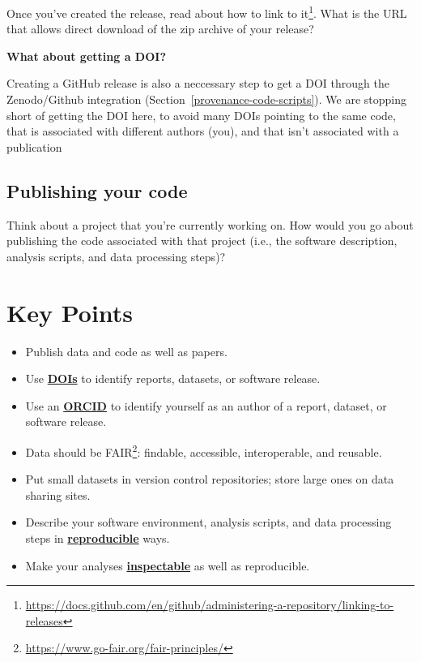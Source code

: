 \documentclass[
]{krantz}
\providecommand{\tightlist}{%
  \setlength{\itemsep}{0pt}\setlength{\parskip}{0pt}}
\renewenvironment{quote}{\begin{VF}}{\end{VF}}
\renewcommand{\href}[2]{#2\footnote{\url{#1}}}
\newcommand{\gref}[2]{\hyperlink{#2}{\textbf{#1}}}
\begin{document}
Once you've created the release,
\href{https://docs.github.com/en/github/administering-a-repository/linking-to-releases}{read about how to link to it}.
What is the URL that allows direct download of the zip archive
of your release?

\begin{quote}
\textbf{What about getting a DOI?}

Creating a GitHub release is also a neccessary step
to get a DOI through the Zenodo/Github integration
(Section~\ref{provenance-code-scripts}).
We are stopping short of getting the DOI here,
to avoid many DOIs pointing to the same code,
that is associated with different authors (you),
and that isn't associated with a publication
\end{quote}

\hypertarget{provenance-ex-publish-code}{%
\subsection{Publishing your code}\label{provenance-ex-publish-code}}

Think about a project that you're currently working on.
How would you go about publishing the code associated with that project
(i.e., the software description, analysis scripts, and data processing steps)?

\hypertarget{publish-keypoints}{%
\section{Key Points}\label{publish-keypoints}}

\begin{itemize}
\tightlist
\item
  Publish data and code as well as papers.
\item
  Use \gref{DOIs}{doi} to identify reports, datasets, or software release.
\item
  Use an \gref{ORCID}{orcid} to identify yourself as an author of a report, dataset, or software release.
\item
  Data should be \href{https://www.go-fair.org/fair-principles/}{FAIR}: findable, accessible, interoperable, and reusable.
\item
  Put small datasets in version control repositories; store large ones on data sharing sites.
\item
  Describe your software environment, analysis scripts, and data processing steps in \gref{reproducible}{reproducible\_research} ways.
\item
  Make your analyses \gref{inspectable}{inspectability} as well as reproducible.
\end{itemize}
\end{document}
